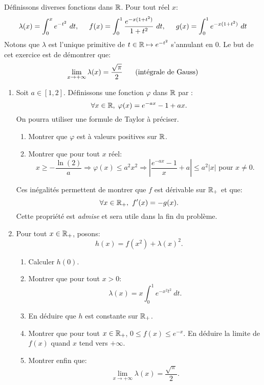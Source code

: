 Définissons diverses fonctions dans $\mathbb{R}$. Pour tout réel $x$:
\begin{displaymath}
\lambda (x) = \int_{0}^{x}e^{-t^{2}}\ dt,
\hspace{0.5cm}
f(x) = \int_{0}^{1}\frac{e^{-x(1+t^{2})}}{1+t^{2}}\ dt ,
\hspace{0.5cm}
g(x) = \int_{0}^{1}e^{-x(1+t^{2})}\ dt
\end{displaymath}
Notons que $\lambda$ est l'unique primitive de $t\in \mathbb{R}\mapsto e^{-t^{2}}$ s'annulant en $0$.\newline
Le but de cet exercice est de démontrer que:
\begin{displaymath}
\lim_{x\to + \infty} \lambda (x) = \frac{\sqrt{\pi}}{2} \hspace{0.5cm} \text{ (intégrale de Gauss)}  
\end{displaymath}

\begin{enumerate}
\item Soit $a\in [1,2]$. Définissons une fonction $\varphi$ dans $\mathbb{R}$ par :
\[
\forall x \in \mathbb{R}, \; \varphi (x) = e^{-ax} - 1 + ax .
\]
On pourra utiliser une formule de Taylor à préciser.

\begin{enumerate}
\item Montrer que $\varphi$ est à valeurs positives sur $\mathbb{R}$.
\item Montrer que pour tout $x$ réel:
\[
x\geq  -\frac{\ln (2)}{a} \Rightarrow  \varphi(x) \leq a^2x^2 \Rightarrow \left|\frac{e^{-ax} - 1}{x} + a\right|\leq a^{2}|x| \text{ pour } x\neq 0.
\]
\end{enumerate}
Ces inégalités permettent de montrer que $f$ est dérivable sur $\mathbb{R}_{+}$ et que:
\[\forall x\in \mathbb{R}_{+},\ f'(x) = -g(x).\]
Cette propriété est \emph{admise} et sera utile dans la fin du problème.

\item Pour tout $x\in \mathbb{R}_{+}$, posons:
\[h(x) = f(x^{2}) + \lambda (x)^{2}.\]
\begin{enumerate}
\item Calculer $h(0)$.
\item Montrer que pour tout $x>0$:
\[\lambda (x) = x\int_{0}^{1}e^{-x^{2}t^{2}}\ dt.\]
\item En déduire que $h$ est constante sur $\mathbb{R}_{+}$.
\item Montrer que pour tout $x\in \mathbb{R}_{+}$, $0\leq f(x) \leq e^{-x}$. En déduire la limite de $f(x)$ quand $x$ tend vers $+\infty$.
\item Montrer enfin que:
\[\lim_{x\to + \infty} \lambda (x) = \frac{\sqrt{\pi}}{2}.\]

\end{enumerate}

\end{enumerate}

